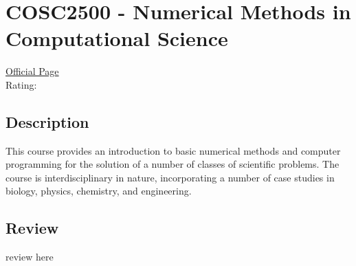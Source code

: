 \hypertarget{COSC2500}{\section{COSC2500 - Numerical Methods in Computational Science}}

\large
\textcolor{turbo_purple}{\href{https://my.uq.edu.au/programs-courses/course.html?course_code=COSC2500}{Official Page}} \\
Rating: \cstar\cstar\cstar\cstar\ostar

\normalsize
\subsection*{Description}
This course provides an introduction to basic numerical methods and computer programming for the solution of a number of classes of scientific problems.
The course is interdisciplinary in nature, incorporating a number of case studies in biology, physics, chemistry, and engineering.

\subsection*{Review}
review here
